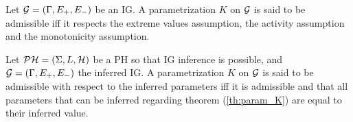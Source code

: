 \begin{definition}
Let $\mathcal{G} = (\Gamma, E_+, E_-)$ be an IG. A parametrization $K$ on $\mathcal{G}$ is said to be admissible iff it respects the extreme values assumption, the activity assumption and the monotonicity assumption.
\end{definition}

\begin{definition}
\label{prop:param_enum_inf}
Let $\mathcal{PH} = (\Sigma, L, \mathcal{H})$ be a PH so that IG inference is possible, and $\mathcal{G} = (\Gamma, E_+, E_-)$ the inferred IG. A parametrization $K$ on $\mathcal{G}$ is said to be admissible with respect to the inferred parameters iff it is admissible and that all parameters that can be inferred regarding theorem (\ref{th:param_K}) are equal to their inferred value.
\end{definition}



